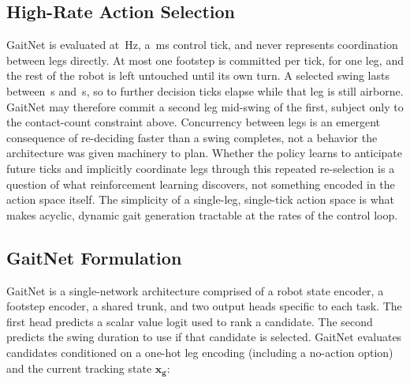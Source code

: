 \subsection{High-Rate Action Selection}
\label{subsec:methodology-high-rate-selection}

GaitNet is evaluated at \corlControlHz\,Hz, a \corlControlTickMs\,ms
control tick, and never represents coordination between legs
directly. At most one footstep is committed per tick, for one leg,
and the rest of the robot is left untouched until its own turn. A
selected swing lasts between \corlSwingDurationMin\,s and
\corlSwingDurationMax\,s, so \numberstringnum{\corlMinTicksPerSwing}
to \numberstringnum{\corlMaxTicksPerSwing} further decision ticks
elapse while that leg is still airborne. GaitNet may therefore commit
a second leg mid-swing of the first, subject only to the
contact-count constraint above. Concurrency between legs is an
emergent consequence of re-deciding faster than a swing completes,
not a behavior the architecture was given machinery to plan. Whether
the policy learns to anticipate future ticks and implicitly
coordinate legs through this repeated re-selection is a question of
what reinforcement learning discovers, not something encoded in the
action space itself. The simplicity of a single-leg, single-tick
action space is what makes acyclic, dynamic gait generation tractable
at the rates of the control loop.

\subsection{GaitNet Formulation}
\label{subsec:methodology-gaitnet-architecture}

GaitNet is a single-network architecture comprised of a robot state
encoder, a footstep encoder, a shared trunk, and two output heads
specific to each task. The first head predicts a scalar value
logit used to rank a candidate. The second predicts the swing
duration to use if that candidate is selected. GaitNet evaluates
candidates conditioned on a one-hot leg encoding (including a
no-action option) and the current tracking state $\mathbf{x_g}$:

